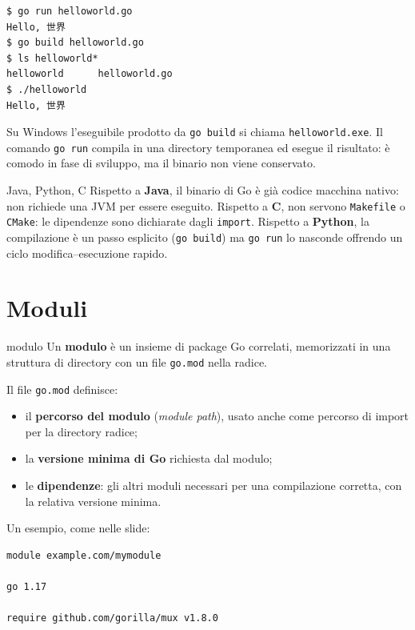 \documentclass[11pt,a4paper]{report}
\newcommand{\cod}[1]{\texttt{#1}}
\begin{document}
\begin{lstlisting}[style=shell]
$ go run helloworld.go
Hello, 世界
$ go build helloworld.go
$ ls helloworld*
helloworld      helloworld.go
$ ./helloworld
Hello, 世界
\end{lstlisting}

Su Windows l'eseguibile prodotto da \cod{go build} si chiama
\texttt{helloworld.exe}. Il comando \cod{go run} compila in una directory
temporanea ed esegue il risultato: è comodo in fase di sviluppo, ma il binario non
viene conservato.

\begin{confronto}{Java, Python, C}
Rispetto a \textbf{Java}, il binario di Go è già codice macchina nativo: non
richiede una JVM per essere eseguito. Rispetto a \textbf{C}, non servono
\cod{Makefile} o \cod{CMake}: le dipendenze sono dichiarate dagli \cod{import}.
Rispetto a \textbf{Python}, la compilazione è un passo esplicito (\cod{go build})
ma \cod{go run} lo nasconde offrendo un ciclo modifica--esecuzione rapido.
\end{confronto}

\section{Moduli}\label{sec:moduli}

\begin{definizione}{modulo}
Un \textbf{modulo} è un insieme di package Go correlati, memorizzati in una
struttura di directory con un file \texttt{go.mod} nella radice.
\end{definizione}

Il file \texttt{go.mod} definisce:

\begin{itemize}
  \item il \textbf{percorso del modulo} (\emph{module path}), usato anche come
        percorso di import per la directory radice;
  \item la \textbf{versione minima di Go} richiesta dal modulo;
  \item le \textbf{dipendenze}: gli altri moduli necessari per una compilazione
        corretta, con la relativa versione minima.
\end{itemize}

Un esempio, come nelle slide:

\begin{lstlisting}[style=shell,caption={Esempio di \texttt{go.mod} (dalla slide)}]
module example.com/mymodule

go 1.17

require github.com/gorilla/mux v1.8.0
\end{lstlisting}
\end{document}
